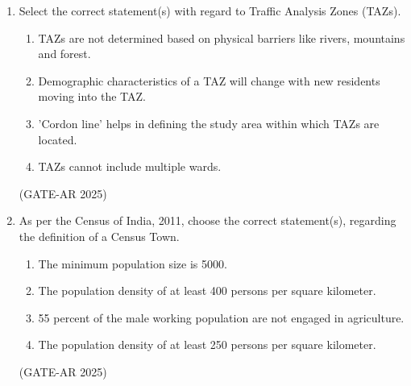 \documentclass[a4paper,10pt]{article}
\begin{document}
\begin{enumerate}
\item Select the correct statement(s) with regard to Traffic Analysis Zones (TAZs).
\begin{enumerate}
    \item TAZs are not determined based on physical barriers like rivers, mountains and forest.
    \item Demographic characteristics of a TAZ will change with new residents moving into the TAZ.
    \item 'Cordon line' helps in defining the study area within which TAZs are located.
    \item TAZs cannot include multiple wards.
\end{enumerate}
\hfill (GATE-AR 2025)

\item As per the Census of India, 2011, choose the correct statement(s), regarding the definition of a Census Town.
\begin{enumerate}
    \item The minimum population size is 5000.
    \item The population density of at least 400 persons per square kilometer.
    \item 55 percent of the male working population are not engaged in agriculture.
    \item The population density of at least 250 persons per square kilometer.
\end{enumerate}
\hfill (GATE-AR 2025)


\end{enumerate}
\end{document}
